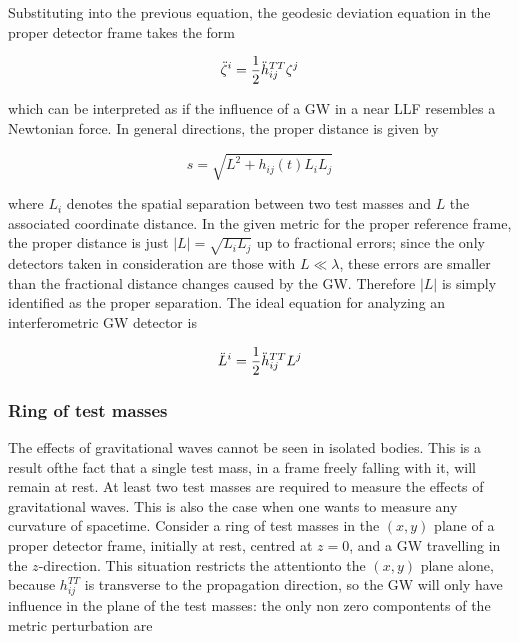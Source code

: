 \documentclass[binding=0.6cm, LaM]{sapthesis}
\begin{document}
	Substituting into the previous equation, the geodesic deviation equation in the proper detector frame takes the form

		\begin{equation}
		{\ddot \zeta}^i = {1 \over 2}{\ddot h}_{ij}^{TT}\zeta^j
		\end{equation}

	which can be interpreted as if the influence of a GW in a near LLF resembles a Newtonian force.
	In general directions, the proper distance is given by

		\begin{equation}
		s = \sqrt{L^2 + h_{ij}(t)L_{i}L_{j}}
		\end{equation}

	where $L_i$ denotes the spatial separation between two test masses and $L$ the associated coordinate distance.
	In the given metric for the proper reference frame, the proper distance is just $|L| = \sqrt{L_iL_j}$ up to fractional errors; 
	since the only detectors taken in consideration are those
	with $L \ll \lambda$, these errors are smaller than the fractional distance changes caused by the GW.
	Therefore $|L|$ is simply identified as the proper separation. The ideal equation for analyzing an interferometric GW detector is

		\begin{equation}
		{\ddot L}^i = {1 \over 2}{\ddot h}_{ij}^{TT}L^j
		\end{equation}


\subsubsection{Ring of test masses}

	The effects of gravitational waves cannot be seen in isolated bodies. 
	This is a result ofthe fact that a single test mass, in a frame freely falling with it, 
	will remain at rest. At least two test masses are required to measure the effects of gravitational waves. 
	This is also the case when one wants to measure any curvature of spacetime.
	Consider a ring of test masses in the $(x, y)$ plane of a proper detector frame, initially at rest, centred at $z = 0$, 
	and a GW travelling in the $z$-direction.
	This situation restricts the attentionto the $(x,y)$ plane alone, because $h_{ij}^{TT}$ is transverse to the propagation direction, 
	so the GW will only have influence in the plane of the test masses:
	the only non zero compontents of the metric perturbation are
\end{document}

